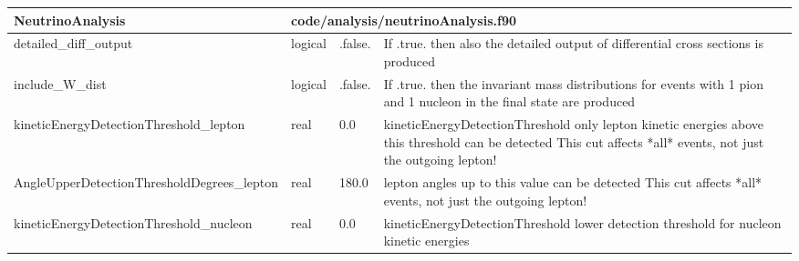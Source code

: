\documentclass{article}
\begin{document}
\begin{longtable}{llll}
\toprule
\textbf{\large{NeutrinoAnalysis}} & \multicolumn{3}{l}{\footnotesize{code/analysis/neutrinoAnalysis.f90}}\\*
\midrule
\endfirsthead
\midrule
\endhead
detailed\_diff\_output & \begin{minipage}[t]{2cm}logical\end{minipage} & \begin{minipage}[t]{2cm}.false.\end{minipage} & \begin{minipage}[t]{12cm}If .true. then also the detailed output of differential cross sections is produced\end{minipage}\\*
\midrule
include\_W\_dist & \begin{minipage}[t]{2cm}logical\end{minipage} & \begin{minipage}[t]{2cm}.false.\end{minipage} & \begin{minipage}[t]{12cm}If .true. then the invariant mass distributions for events with 1 pion and 1 nucleon in the final state are produced\end{minipage}\\*
\midrule
kineticEnergyDetectionThreshold\_lepton & \begin{minipage}[t]{2cm}real\end{minipage} & \begin{minipage}[t]{2cm}0.0\end{minipage} & \begin{minipage}[t]{12cm}kineticEnergyDetectionThreshold only lepton kinetic energies above this threshold can be detected This cut affects *all* events, not just the outgoing lepton!\end{minipage}\\*
\midrule
AngleUpperDetectionThresholdDegrees\_lepton & \begin{minipage}[t]{2cm}real\end{minipage} & \begin{minipage}[t]{2cm}180.0\end{minipage} & \begin{minipage}[t]{12cm}lepton angles up to this value can be detected This cut affects *all* events, not just the outgoing lepton!\end{minipage}\\*
\midrule
kineticEnergyDetectionThreshold\_nucleon & \begin{minipage}[t]{2cm}real\end{minipage} & \begin{minipage}[t]{2cm}0.0\end{minipage} & \begin{minipage}[t]{12cm}kineticEnergyDetectionThreshold lower detection threshold for nucleon kinetic energies\end{minipage}\\*

\end{longtable}
\end{document}
